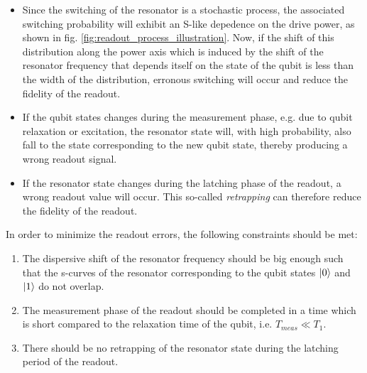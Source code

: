 \begin{itemize}
\item Since the switching of the resonator is a stochastic process, the associated switching probability will exhibit an S-like depedence on the drive power, as shown in fig. \ref{fig:readout_process_illustration}. Now, if the shift of this distribution along the power axis which is induced by the shift of the resonator frequency that depends itself on the state of the qubit is less than the width of the distribution, erronous switching will occur and reduce the fidelity of the readout.
\item If the qubit states changes during the measurement phase, e.g. due to qubit relaxation or excitation, the resonator state will, with high probability, also fall to the state corresponding to the new qubit state, thereby producing a wrong readout signal.
\item If the resonator state changes during the latching phase of the readout, a wrong readout value will occur. This so-called {\it retrapping} can therefore reduce the fidelity of the readout.
\end{itemize}

In order to minimize the readout errors, the following constraints should be met:

\begin{enumerate}
\item The dispersive shift of the resonator frequency should be big enough such that the s-curves of the resonator corresponding to the qubit states $\left| 0 \right>$ and $\left| 1 \right>$ do not overlap.
\item The measurement phase of the readout should be completed in a time which is short compared to the relaxation time of the qubit, i.e. $T_{meas}\ll T_1$.
\item There should be no retrapping of the resonator state during the latching period of the readout.
\end{enumerate}

